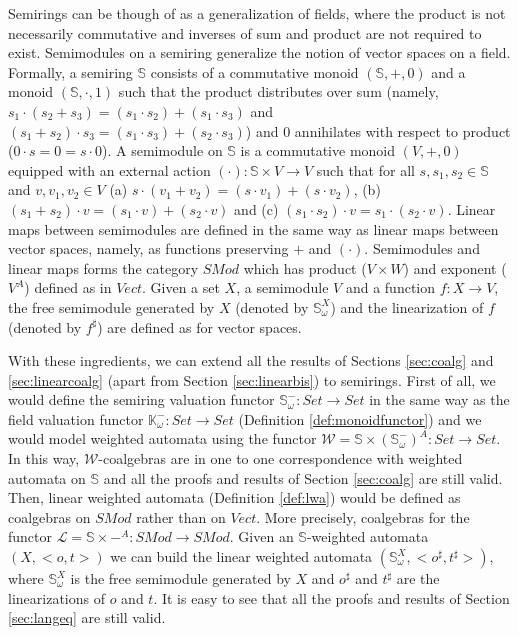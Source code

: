 \documentclass[3p]{elsarticle}
\newcommand{\fW}{\mathcal{W}}    %
\newcommand{\fL}{\mathcal{L}}    %
\newcommand{\K}{\mathbb{K}}            %
\newcommand{\SR}{\mathbb{S}}            %
\begin{document}
%
Semirings can be though of as a generalization of fields, where the product is not necessarily commutative and
inverses of sum and product are not required to exist. Semimodules on a semiring generalize the notion of vector spaces on a field. Formally, a semiring $\SR$ consists of a commutative monoid $(\SR,+, 0)$ and a monoid $(\SR,\cdot, 1)$
such that the product distributes over sum (namely, $s_1 \cdot (s_2 +s_3) = (s_1\cdot s_2) + (s_1\cdot s_3)$ and
$( s_1 + s_2) \cdot s_3 = (s_1\cdot s_3) + (s_2\cdot s_3)$) and $0$ annihilates with respect to product ($0\cdot s= 0 = s\cdot 0$). A semimodule on $\SR$ is a commutative monoid $(V,+,0)$ equipped with an external action $(\cdot)\colon \SR \times V \to V$ such that for all
$s,s_1,s_2\in \SR$ and $v,v_1,v_2\in V$ (a) $s\cdot (v_1 + v_2) = (s\cdot v_1) + (s\cdot v_2)$,
(b) $(s_1 +s_2) \cdot v  = (s_1\cdot v) + (s_2\cdot v)$ and (c) $(s_1\cdot s_2) \cdot v = s_1\cdot (s_2 \cdot v)$.
Linear maps between semimodules are defined in the same way as linear maps between vector spaces, namely, as functions preserving $+$ and $(\cdot)$.
Semimodules and linear maps forms the category $SMod$ which has product ($V\times W$) and exponent ($V^A$) defined as in $Vect$.
Given a set $X$, a semimodule $V$ and a function $f\colon X \to V$, the free semimodule generated by $X$ (denoted by $\SR_{\omega}^X$) and
the linearization of $f$ (denoted by $f^\sharp$) are defined as for vector spaces.


With these ingredients, we can extend all the results of Sections \ref{sec:coalg} and \ref{sec:linearcoalg} (apart from Section \ref{sec:linearbis})
to semirings. First of all, we would define the semiring valuation functor $\SR^-_{\omega}\colon Set \to Set$
in the same way as the field valuation functor $\K^-_{\omega}\colon Set \to Set$ (Definition \ref{def:monoidfunctor})
and we would model weighted automata using the functor $\fW =\SR \times (\SR^-_{\omega})^A \colon Set \to Set$. In this way, $\fW$-coalgebras are in one to one
correspondence with weighted automata on $\SR$ and all the proofs and results of Section \ref{sec:coalg} are still valid.
Then, linear weighted automata (Definition \ref{def:lwa}) would be defined as coalgebras on $SMod$ rather than on $Vect$. More precisely, coalgebras for the
functor $\fL = \SR \times -^A \colon SMod \to SMod$. Given an $\SR$-weighted automata $(X, <o,t>)$ we can build the linear weighted automata
$(\SR^X_{\omega}, <o^{\sharp} , t^{\sharp} >)$, where $\SR^X_{\omega}$ is the free semimodule generated by $X$ and
$o^{\sharp}$ and $t^{\sharp}$ are the linearizations of $o$ and $t$. It is easy to see that all the proofs and results of
Section \ref{sec:langeq} are still valid.
\end{document}
